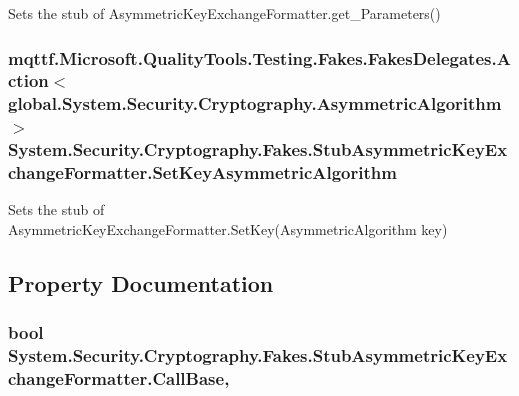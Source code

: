 Sets the stub of Asymmetric\-Key\-Exchange\-Formatter.\-get\-\_\-\-Parameters()

\hypertarget{class_system_1_1_security_1_1_cryptography_1_1_fakes_1_1_stub_asymmetric_key_exchange_formatter_af326864d5558baad9393a0b11c508ed7}{
\subsubsection[{Set\-Key\-Asymmetric\-Algorithm}]{\setlength{\rightskip}{0pt plus 5cm}mqttf.\-Microsoft.\-Quality\-Tools.\-Testing.\-Fakes.\-Fakes\-Delegates.\-Action$<$global.\-System.\-Security.\-Cryptography.\-Asymmetric\-Algorithm$>$ System.\-Security.\-Cryptography.\-Fakes.\-Stub\-Asymmetric\-Key\-Exchange\-Formatter.\-Set\-Key\-Asymmetric\-Algorithm}}\label{class_system_1_1_security_1_1_cryptography_1_1_fakes_1_1_stub_asymmetric_key_exchange_formatter_af326864d5558baad9393a0b11c508ed7}


Sets the stub of Asymmetric\-Key\-Exchange\-Formatter.\-Set\-Key(\-Asymmetric\-Algorithm key)



\subsection{Property Documentation}
\hypertarget{class_system_1_1_security_1_1_cryptography_1_1_fakes_1_1_stub_asymmetric_key_exchange_formatter_a7f7f0e9aa2c108fb02a604909c6c5da1}{
\subsubsection[{Call\-Base}]{\setlength{\rightskip}{0pt plus 5cm}bool System.\-Security.\-Cryptography.\-Fakes.\-Stub\-Asymmetric\-Key\-Exchange\-Formatter.\-Call\-Base\hspace{0.3cm}{\ttfamily [get]}, {\ttfamily [set]}}}\label{class_system_1_1_security_1_1_cryptography_1_1_fakes_1_1_stub_asymmetric_key_exchange_formatter_a7f7f0e9aa2c108fb02a604909c6c5da1}


